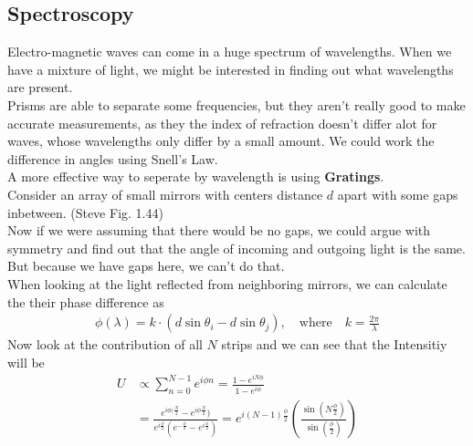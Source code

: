 \subsection{Spectroscopy}
Electro-magnetic waves can come in a huge spectrum of wavelengths. When we have a mixture of light, we might be interested in finding out what wavelengths are present.\\
Prisms are able to separate some frequencies, but they aren't really good to make accurate measurements, as they the index of refraction doesn't differ alot for waves, whose wavelengths only differ by a small amount. We could work the difference in angles using Snell's Law.\\

A more effective way to seperate by wavelength is using \textbf{Gratings}.\\
Consider an array of small mirrors with centers distance $d$ apart with some gaps inbetween. (Steve Fig. 1.44)\\
Now if we were assuming that there would be no gaps, we could argue with symmetry and find out that the angle of incoming and outgoing light is the same. But because we have gaps here, we can't do that.\\
When looking at the light reflected from neighboring mirrors, we can calculate the their phase difference as
\begin{align*}
	\phi(\lambda) = k \cdot \left( d \sin \theta_i - d \sin \theta_j\right), \quad \text{where} \quad k = \frac{2\pi}{\lambda}
\end{align*}
Now look at the contribution of all $N$ strips and we can see that the Intensitiy will be
\begin{align*}
	U &\propto \sum_{n=0}^{N-1} e^{i\phi n} = \frac{1 - e^{iN\phi}}{1 - e^{i\phi}} \\
		&= \frac{e^{i\phi (\frac{N}{2}} - e^{i\phi \frac{N}{2}})}{e^{i \frac{\phi}{2}} (e^{- \frac{\phi}{2}} - e^{i \frac{\phi}{2}})}	
		= e^{i(N-1) \frac{\phi}{2}} \left(\frac{\sin(N \frac{\phi}{2})}{\sin (\frac{\phi}{2})}\right)
\end{align*}

